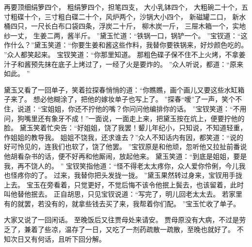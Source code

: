 再要顶细绢箩四个，
粗绢箩四个，担笔四支，
大小乳钵四个，
大粗碗二十个，五寸粗碟十个，三寸粗白碟二十个，风炉两个，沙锅大小四个，
新磁罐二口，
新水桶四只，一尺长白布口袋四条，浮炭二十斤，
柳木炭一斤，
三屉木箱一个，实地纱一丈，
生姜二两，酱半斤。
”黛玉忙道：“铁锅一口，锅铲一个。
”宝钗道：“这作什么？”黛玉笑道：“你要生姜和酱这些作料，我替你要铁锅来，好炒颜色吃的。
”众人都笑起来。
宝钗笑道：“你那里知道。
那粗色碟子保不住不上火烤，不拿姜汁子和酱预先抹在底子上烤过了，一经了火是要炸的。
”众人听说，都道：“原来如此。
”\par
黛玉又看了一回单子，笑着拉探春悄悄的道：“你瞧瞧，画个画儿又要这些水缸箱子来了。
想必他糊涂了，把他的嫁妆单子也写上了。
”探春“嗳”了一声，笑个不住，说道：“宝姐姐，你还不拧他的嘴？你问问他编排你的话。
”宝钗笑道：“不用问，狗嘴里还有象牙不成！”一面说，一面走上来，把黛玉按在炕上，便要拧他的脸。
黛玉笑着忙央告：“好姐姐，饶了我罢！颦儿年纪小，只知说，不知道轻重，作姐姐的教导我。
姐姐不饶我，还求谁去？”众人不知话内有因，都笑道：“说的好可怜见的，连我们也软了，饶了他罢。
”宝钗原是和他顽，忽听他又拉扯前番说他胡看杂书的话，便不好再和他厮闹，放起他来。
黛玉笑道：“到底是姐姐，要是我，再不饶人的。
”
宝钗笑指他道：“怪不得老太太疼你，众人爱你伶俐，今儿我也怪疼你的了。
过来，我替你把头发拢一拢。
”黛玉果然转过身来，宝钗用手拢上去。
宝玉在旁看着，只觉更好，不觉后悔不该令他抿上鬓去，也该留着，此时叫他替他抿去。
正自胡思，只见宝钗说道：“写完了，明儿回老太太去。
若家里有的就罢，若没有的，就拿些钱去买了来，我帮着你们配。
”宝玉忙收了单子。
\par
大家又说了一回闲话。
至晚饭后又往贾母处来请安。
贾母原没有大病，不过是劳乏了，兼着了些凉，温存了一日，又吃了一剂药疏散一疏散，至晚也就好了。
不知次日又有何话，且听下回分解。
\par
{}
